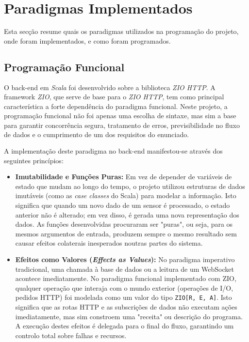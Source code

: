 \section{Paradigmas Implementados} \label{sec:paradigmas_implementacao}

Esta secção resume quais os paradigmas utilizados na programação do projeto, onde foram implementados, e como foram programados.

\subsection{Programação Funcional}
O back-end em \textit{Scala} foi desenvolvido sobre a biblioteca \textit{ZIO HTTP}. A framework \textit{ZIO}, que serve de base para o \textit{ZIO HTTP}, tem como principal característica a forte dependência do paradigma funcional. Neste projeto, a programação funcional não foi apenas uma escolha de sintaxe, mas sim a base para garantir concorrência segura, tratamento de erros, previsibilidade no fluxo de dados e o cumprimento de um dos requisitos do enunciado.

A implementação deste paradigma no back-end manifestou-se através dos seguintes princípios:
\begin{itemize}
	\item \textbf{Imutabilidade e Funções Puras:} Em vez de depender de variáveis de estado que mudam ao longo do tempo, o projeto utilizou estruturas de dados imutáveis (como as \textit{case classes} do Scala) para modelar a informação. Isto significa que quando um novo dado de um sensor é processado, o estado anterior não é alterado; em vez disso, é gerada uma nova representação dos dados. As funções desenvolvidas procuraram ser "puras", ou seja, para os mesmos argumentos de entrada, produzem sempre o mesmo resultado sem causar efeitos colaterais inesperados noutras partes do sistema.
	
	\item \textbf{Efeitos como Valores (\textit{Effects as Values}):} No paradigma imperativo tradicional, uma chamada à base de dados ou a leitura de um WebSocket acontece imediatamente. No paradigma funcional implementado com ZIO, qualquer operação que interaja com o mundo exterior (operações de I/O, pedidos HTTP) foi modelada como um valor do tipo \texttt{ZIO[R, E, A]}. Isto significa que as rotas HTTP e as subscrições de dados não executam ações imediatamente, mas sim constroem uma "receita" ou descrição do programa. A execução destes efeitos é delegada para o final do fluxo, garantindo um controlo total sobre falhas e recursos.
\end{itemize}


